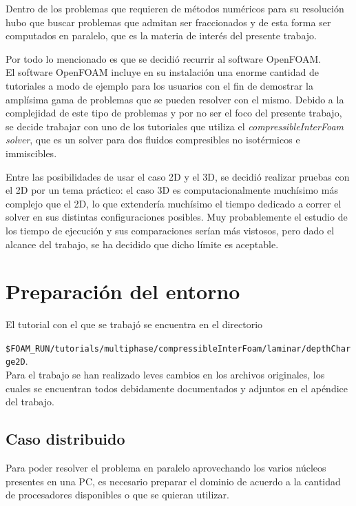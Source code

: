 \documentclass{article}
\begin{document}
Dentro de los problemas que requieren de métodos numéricos para su resolución hubo que buscar problemas que admitan ser fraccionados y de esta forma ser computados en paralelo, que es la materia de interés del presente trabajo. 

Por todo lo mencionado es que se decidió recurrir al software OpenFOAM.\\

El software OpenFOAM incluye en su instalación una enorme cantidad de tutoriales a modo de ejemplo para los usuarios con el fin de demostrar la amplísima gama de problemas que se pueden resolver con el mismo. Debido a la complejidad de este tipo de problemas y por no ser el foco del presente trabajo, se decide trabajar con uno de los tutoriales que utiliza el \textit{compressibleInterFoam solver}, que es un solver para dos fluidos compresibles no isotérmicos e immiscibles.

Entre las posibilidades de usar el caso 2D y el 3D, se decidió realizar pruebas con el 2D por un tema práctico: el caso 3D es computacionalmente muchísimo más complejo que el 2D, lo que extendería muchísimo el tiempo dedicado a correr el solver en sus distintas configuraciones posibles. Muy probablemente el estudio de los tiempo de ejecución y sus comparaciones serían más vistosos, pero dado el alcance del trabajo, se ha decidido que dicho límite es aceptable.

\newpage
\section{Preparación del entorno}
El tutorial con el que se trabajó se encuentra en el directorio 

\texttt{\$FOAM\_RUN/tutorials/multiphase/compressibleInterFoam/laminar/depthCharge2D}.\\

Para el trabajo se han realizado leves cambios en los archivos originales, los cuales se encuentran todos debidamente documentados y adjuntos en el apéndice del trabajo.

\subsection{Caso distribuido}
Para poder resolver el problema en paralelo aprovechando los varios núcleos presentes en una PC, es necesario preparar el dominio de acuerdo a la cantidad de procesadores disponibles o que se quieran utilizar.\\
\end{document}
